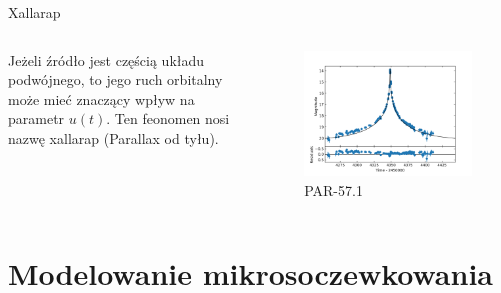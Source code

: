 \documentclass{beamer}
\begin{document}
\begin{frame}{Xallarap}
    \begin{columns}
        \begin{column}{0.5\linewidth}
            Jeżeli źródło jest częścią układu podwójnego, to jego ruch orbitalny może mieć znaczący wpływ na parametr $u(t)$.
            Ten feonomen nosi nazwę xallarap (Parallax od tyłu).
        \end{column}
        \begin{column}{0.5\linewidth}
            \begin{figure}
                \centering
                \includegraphics[width = \textwidth]{../sim30/xallarap/png/PAR-57-noaver.dat.1.png}
                \caption*{\tiny{PAR-57.1}}
            \end{figure}
        \end{column}
    \end{columns}
\end{frame}

\section{Modelowanie mikrosoczewkowania}
\end{document}
